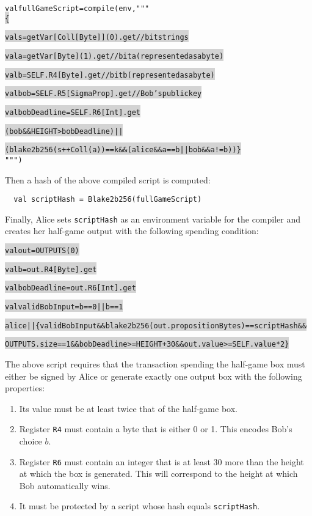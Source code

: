\documentclass[11pt]{article}
\newcommand\Hi[2][lightgray]{%
	\hspace*{-\fboxsep}%
	\colorbox{#1}{#2}%
	\hspace*{-\fboxsep}%
}
\begin{document}
\begin{alltt}
val fullGameScript = compile(env, """ \Hi{\{}
  \Hi{val s     = getVar[Coll[Byte]](0).get // bit string s}
  \Hi{val a     = getVar[Byte](1).get       // bit a (represented as a byte)}
  \Hi{val b     = SELF.R4[Byte].get         // bit b (represented as a byte)}
  \Hi{val bob   = SELF.R5[SigmaProp].get    // Bob's public key}
  \Hi{val bobDeadline = SELF.R6[Int].get}
   
  \Hi{(bob && HEIGHT > bobDeadline) || }
  \Hi{(blake2b256(s ++ Coll(a)) == k && (alice && a == b || bob && a != b)) \}} """)
\end{alltt}

Then a hash of the above compiled script is computed:

\begin{verbatim}
  val scriptHash = Blake2b256(fullGameScript)
\end{verbatim}

Finally, Alice sets \texttt{scriptHash} as an environment variable for the compiler and creates her half-game output with the following spending condition:

\begin{alltt}
  \Hi{val out           = OUTPUTS(0)}
  \Hi{val b             = out.R4[Byte].get}
  \Hi{val bobDeadline   = out.R6[Int].get}
  \Hi{val validBobInput = b == 0 || b == 1}

  \Hi{alice || \{ validBobInput && blake2b256(out.propositionBytes) == scriptHash &&}
  \Hi{OUTPUTS.size == 1 && bobDeadline >= HEIGHT+30 && out.value >= SELF.value * 2 \}}
\end{alltt}

The above script requires that the transaction spending the half-game box must either be signed by Alice or generate exactly one output box with the following properties:

\begin{enumerate}
	\item Its value must be at least twice that of the half-game box.
	\item Register \texttt{R4} must contain a byte that is either 0 or 1. This encodes Bob's choice $b$.
	\item Register \texttt{R6} must contain an integer that is at least 30 more than the height at which the box is generated. This will correspond to the height at which Bob automatically wins.
	\item It must be protected by a script whose hash equals \texttt{scriptHash}.
\end{enumerate}
 
\end{document}
